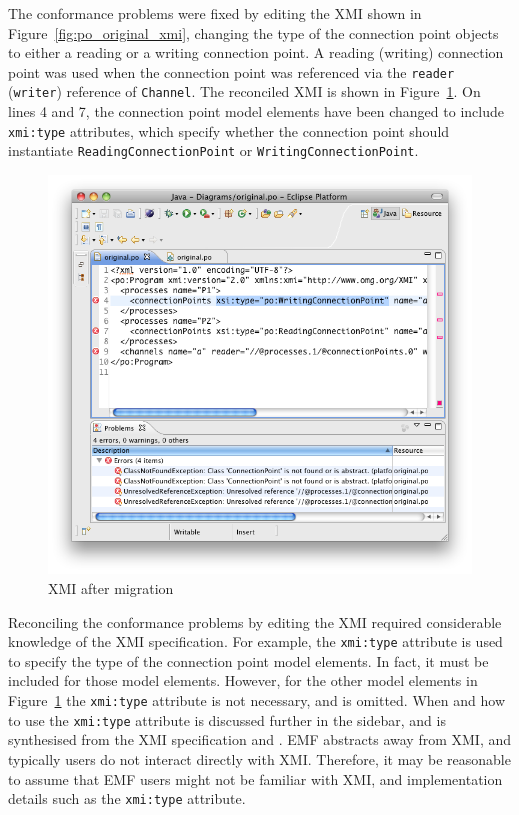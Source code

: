 The conformance problems were fixed by editing the XMI shown in Figure~\ref{fig:po_original_xmi}, changing the type of the connection point objects to either a reading or a writing connection point. A reading (writing) connection point was used when the connection point was referenced via the \texttt{reader} (\texttt{writer}) reference of \texttt{Channel}. The reconciled XMI is shown in Figure~\ref{fig:po_migrated_xmi}. On lines 4 and 7, the connection point model elements have been changed to include \texttt{xmi:type} attributes, which specify whether the connection point should instantiate \texttt{Re\-ad\-i\-ngCo\-nn\-ec\-ti\-o\-nPo\-i\-nt} or \texttt{Wr\-i\-ti\-ngCo\-nn\-ec\-ti\-o\-nPo\-i\-nt}.

\begin{figure}[htbp]
	\centering
	\includegraphics[width=13.5cm]{6.Evaluation/images/user_driven/po_migrated_xmi.png}
	\caption{XMI after migration}
	\label{fig:po_migrated_xmi}
\end{figure}

Reconciling the conformance problems by editing the XMI required considerable knowledge of the XMI specification. For example, the \texttt{xmi:type} attribute is used to specify the type of the connection point model elements. In fact, it must be included for those model elements. However, for the other model elements in Figure~\ref{fig:po_migrated_xmi} the \texttt{xmi:type} attribute is not necessary, and is omitted. When and how to use the \texttt{xmi:type} attribute is discussed further in the sidebar, and is synthesised from the XMI specification \cite{xmi} and \cite{steinberg09emf}. EMF abstracts away from XMI, and typically users do not interact directly with XMI. Therefore, it may be reasonable to assume that EMF users might not be familiar with XMI, and implementation details such as the \texttt{xmi:type} attribute.

